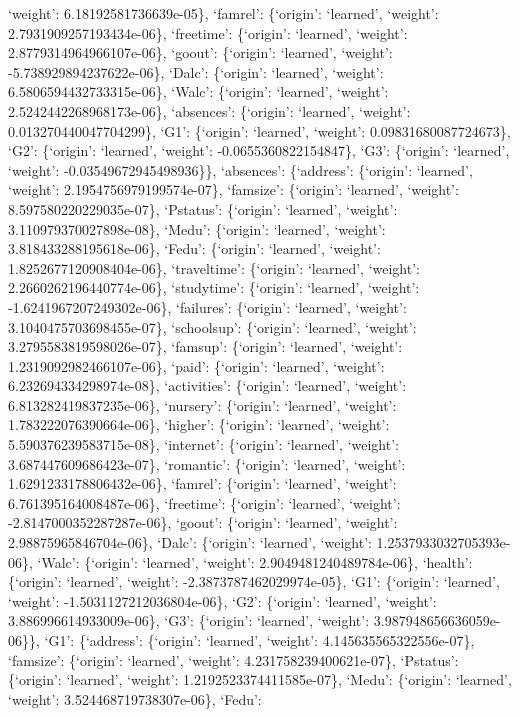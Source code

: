 \documentclass[
]{article}
\begin{document}
`weight': 6.18192581736639e-05\}, `famrel': \{`origin': `learned',
`weight': 2.7931909257193434e-06\}, `freetime': \{`origin': `learned',
`weight': 2.8779314964966107e-06\}, `goout': \{`origin': `learned',
`weight': -5.738929894237622e-06\}, `Dalc': \{`origin': `learned',
`weight': 6.5806594432733315e-06\}, `Walc': \{`origin': `learned',
`weight': 2.5242442268968173e-06\}, `absences': \{`origin': `learned',
`weight': 0.013270440047704299\}, `G1': \{`origin': `learned', `weight':
0.09831680087724673\}, `G2': \{`origin': `learned', `weight':
-0.0655360822154847\}, `G3': \{`origin': `learned', `weight':
-0.03549672945498936\}\}, `absences': \{`address': \{`origin':
`learned', `weight': 2.1954756979199574e-07\}, `famsize': \{`origin':
`learned', `weight': 8.597580220229035e-07\}, `Pstatus': \{`origin':
`learned', `weight': 3.110979370027898e-08\}, `Medu': \{`origin':
`learned', `weight': 3.818433288195618e-06\}, `Fedu': \{`origin':
`learned', `weight': 1.8252677120908404e-06\}, `traveltime': \{`origin':
`learned', `weight': 2.2660262196440774e-06\}, `studytime': \{`origin':
`learned', `weight': -1.6241967207249302e-06\}, `failures': \{`origin':
`learned', `weight': 3.1040475703698455e-07\}, `schoolsup': \{`origin':
`learned', `weight': 3.2795583819598026e-07\}, `famsup': \{`origin':
`learned', `weight': 1.2319092982466107e-06\}, `paid': \{`origin':
`learned', `weight': 6.232694334298974e-08\}, `activities': \{`origin':
`learned', `weight': 6.813282419837235e-06\}, `nursery': \{`origin':
`learned', `weight': 1.783222076390664e-06\}, `higher': \{`origin':
`learned', `weight': 5.590376239583715e-08\}, `internet': \{`origin':
`learned', `weight': 3.687447609686423e-07\}, `romantic': \{`origin':
`learned', `weight': 1.6291233178806432e-06\}, `famrel': \{`origin':
`learned', `weight': 6.761395164008487e-06\}, `freetime': \{`origin':
`learned', `weight': -2.8147000352287287e-06\}, `goout': \{`origin':
`learned', `weight': 2.98875965846704e-06\}, `Dalc': \{`origin':
`learned', `weight': 1.2537933032705393e-06\}, `Walc': \{`origin':
`learned', `weight': 2.9049481240489784e-06\}, `health': \{`origin':
`learned', `weight': -2.3873787462029974e-05\}, `G1': \{`origin':
`learned', `weight': -1.5031127212036804e-06\}, `G2': \{`origin':
`learned', `weight': 3.886996614933009e-06\}, `G3': \{`origin':
`learned', `weight': 3.987948656636059e-06\}\}, `G1': \{`address':
\{`origin': `learned', `weight': 4.145635565322556e-07\}, `famsize':
\{`origin': `learned', `weight': 4.231758239400621e-07\}, `Pstatus':
\{`origin': `learned', `weight': 1.2192523374411585e-07\}, `Medu':
\{`origin': `learned', `weight': 3.524468719738307e-06\}, `Fedu':
\end{document}
